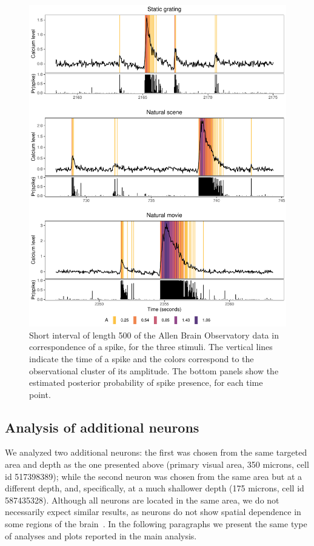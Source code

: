 \begin{figure}
	\centerline{\includegraphics[width = \textwidth]{_Images/ch3_spike_color_prob_new.pdf}}
	\caption[Visual representation of the estimated spikes and their amplitudes in the calcium trace from the Allen Brain Observatory data.]{Short interval of length 500 of the Allen Brain Observatory data in correspondence of a spike, for the three stimuli. The vertical lines indicate the time of a spike and the colors correspond to the observational cluster of its amplitude. The bottom panels show the estimated posterior probability of spike presence, for each time point.}
	\label{fig:spike_color}
\end{figure}







\subsection{Analysis of additional neurons}
We analyzed two additional neurons: the first was chosen from the same targeted area and depth as the one presented above (primary visual area, 350 microns, cell id 517398389); while the second neuron was chosen from the same area but at a different depth, and, specifically, at a much shallower depth (175 microns, cell id 587435328). 
Although all neurons are located in the same area, we do not necessarily expect similar results, as neurons do not show spatial dependence in some regions of the brain~\parencite{rosenbaum2017}.
In the following paragraphs we present the same type of analyses and plots reported in the main analysis. 

